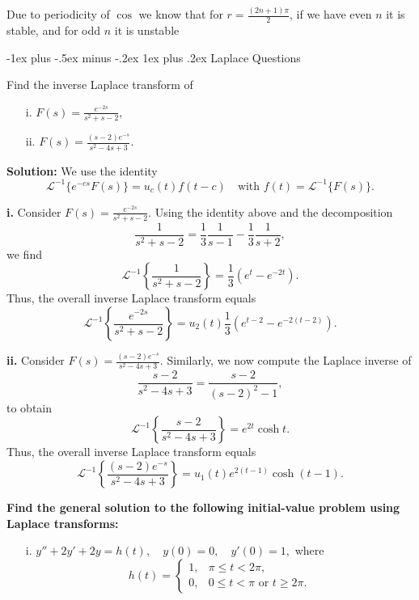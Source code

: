 \documentclass[10pt,landscape]{article}
\makeatletter
\renewcommand{\subsubsection}{\@startsection{subsubsection}{3}{0mm}%
                                {-1ex plus -.5ex minus -.2ex}%
                                {1ex plus .2ex}%
                                {\normalfont\small\bfseries}}
\makeatother
\begin{document}
\begin{multicols}{2}
Due to periodicity of $\cos$ we know that for $r = \displaystyle\frac{(2n+1)\pi}{2}$, if we have even $n$ it is stable, and for odd $n$ it is unstable

\subsubsection{Laplace Questions}

Find the inverse Laplace transform of
\begin{itemize}
    \item[i.] \( F(s) = \frac{e^{-2s}}{s^2 + s - 2} \),
    \item[ii.] \( F(s) = \frac{(s - 2) e^{-s}}{s^2 - 4s + 3} \).
\end{itemize}

\textbf{Solution:} We use the identity\\
\[
\mathcal{L}^{-1}\{ e^{-cs} F(s) \} = u_c(t) f(t - c) \quad \text{with } f(t) = \mathcal{L}^{-1}\{ F(s) \}.
\]

\textbf{i.} Consider \( F(s) = \frac{e^{-2s}}{s^2 + s - 2} \). Using the identity above and the decomposition\\
\[
\frac{1}{s^2 + s - 2} = \frac{1}{3} \frac{1}{s - 1} - \frac{1}{3} \frac{1}{s + 2},
\]
we find\\
\[
\mathcal{L}^{-1}\left\{ \frac{1}{s^2 + s - 2} \right\} = \frac{1}{3} \left( e^t - e^{-2t} \right).
\]
Thus, the overall inverse Laplace transform equals\\
\[
\mathcal{L}^{-1}\left\{ \frac{e^{-2s}}{s^2 + s - 2} \right\} = u_2(t) \frac{1}{3} \left( e^{t-2} - e^{-2(t-2)} \right).
\]

\textbf{ii.} Consider \( F(s) = \frac{(s - 2) e^{-s}}{s^2 - 4s + 3} \). Similarly, we now compute the Laplace inverse of\\
\[
\frac{s - 2}{s^2 - 4s + 3} = \frac{s - 2}{(s - 2)^2 - 1},
\]
to obtain\\
\[
\mathcal{L}^{-1}\left\{ \frac{s - 2}{s^2 - 4s + 3} \right\} = e^{2t} \cosh t.
\]
Thus, the overall inverse Laplace transform equals\\
\[
\mathcal{L}^{-1}\left\{ \frac{(s - 2) e^{-s}}{s^2 - 4s + 3} \right\} = u_1(t) e^{2(t-1)} \cosh(t - 1).
\]

\bigskip
\textbf{Find the general solution to the following initial-value problem using Laplace transforms:}

\begin{itemize}
    \item[i.] \( y'' + 2y' + 2y = h(t), \quad y(0) = 0, \quad y'(0) = 1, \)
    where\\
    \[
    h(t) =
    \begin{cases}
        1, & \pi \le t < 2\pi, \\
        0, & 0 \le t < \pi \text{ or } t \ge 2\pi.
    \end{cases}
    \]
\end{itemize}


\end{multicols}
\end{document}
